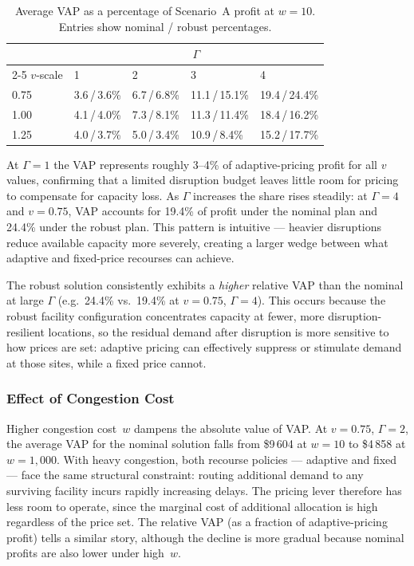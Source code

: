 \begin{table}[htbp]
\centering
\caption{Average VAP as a percentage of Scenario~A profit at $w = 10$.
         Entries show nominal / robust percentages.}
\label{tab:vap_pct}
\setlength{\tabcolsep}{5pt}
\begin{tabular}{lllll}
\toprule
& \multicolumn{4}{c}{$\Gamma$} \\
\cmidrule(lr){2-5}
$v$-scale & 1 & 2 & 3 & 4 \\
\midrule
0.75 & 3.6\,/\,3.6\% & 6.7\,/\,6.8\% & 11.1\,/\,15.1\% & 19.4\,/\,24.4\% \\
1.00 & 4.1\,/\,4.0\% & 7.3\,/\,8.1\% & 11.3\,/\,11.4\% & 18.4\,/\,16.2\% \\
1.25 & 4.0\,/\,3.7\% & 5.0\,/\,3.4\% & 10.9\,/\,8.4\%  & 15.2\,/\,17.7\% \\
\bottomrule
\end{tabular}
\end{table}

At $\Gamma = 1$ the VAP represents roughly 3--4\% of adaptive-pricing
profit for all $v$ values, confirming that a limited disruption budget
leaves little room for pricing to compensate for capacity loss.
As $\Gamma$ increases the share rises steadily: at $\Gamma = 4$ and
$v = 0.75$, VAP accounts for 19.4\% of profit under the nominal plan
and 24.4\% under the robust plan.
This pattern is intuitive — heavier disruptions reduce available
capacity more severely, creating a larger wedge between what adaptive
and fixed-price recourses can achieve.

The robust solution consistently exhibits a \emph{higher} relative VAP
than the nominal at large $\Gamma$ (e.g.\ 24.4\% vs.\ 19.4\% at
$v = 0.75$, $\Gamma = 4$).
This occurs because the robust facility configuration concentrates
capacity at fewer, more disruption-resilient locations, so the residual
demand after disruption is more sensitive to how prices are set:
adaptive pricing can effectively suppress or stimulate demand at those
sites, while a fixed price cannot.

\subsubsection*{Effect of Congestion Cost}

Higher congestion cost~$w$ dampens the absolute value of VAP.
At $v = 0.75$, $\Gamma = 2$, the average VAP for the nominal solution
falls from \$9\,604 at $w = 10$ to \$4\,858 at $w = 1{,}000$.
With heavy congestion, both recourse policies — adaptive and fixed —
face the same structural constraint: routing additional demand to any
surviving facility incurs rapidly increasing delays.
The pricing lever therefore has less room to operate, since the marginal
cost of additional allocation is high regardless of the price set.
The relative VAP (as a fraction of adaptive-pricing profit) tells a
similar story, although the decline is more gradual because nominal
profits are also lower under high~$w$.

